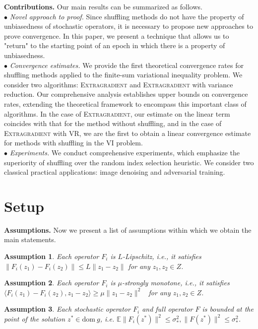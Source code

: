 \documentclass{article}
\newtheorem{assumption}{Assumption}
\begin{document}
\textbf{Contributions.}
Our main results can be summarized as follows.\\
$\bullet$ \textit{Novel approach to proof.} Since shuffling methods do not have the property of unbiasedness of stochastic operators, it is necessary to propose new approaches to prove convergence. In this paper, we present a technique that allows us to "return" to the starting point of an epoch in which there is a property of unbiasedness.\\
$\bullet$ \textit{Convergence estimates.} We provide the first theoretical convergence rates for shuffling methods applied to the finite-sum variational inequality problem. We consider two algorithms: \textsc{Extragradient} and \textsc{Extragradient} with variance reduction. Our comprehensive analysis establishes upper bounds on convergence rates, extending the theoretical framework to encompass this important class of algorithms. In the case of \textsc{Extragradient}, our estimate on the linear term coincides with that for the method without shuffling, and in the case of \textsc{Extragradient} with VR, we are the first to obtain a linear convergence estimate for methods with shuffling in the VI problem.\\
$\bullet$ \textit{Experiments.} We conduct comprehensive experiments, which emphasize the superiority of shuffling over the random index selection heuristic. We consider two classical practical applications: image denoising and adversarial training.

\vspace{-2mm}
\section{Setup}
\vspace{-2mm}

\textbf{Assumptions.} Now we present a list of assumptions within which we obtain the main statements.
\begin{assumption}\label{as:lipschitz}
    Each operator $F_i$ is $L$-Lipschitz, i.e., it satisfies $\|F_i(z_1) - F_i(z_2)\| \leq L\|z_1 - z_2\|$ for any $z_1, z_2 \in Z$.
\end{assumption}
\begin{assumption}\label{as:monotone}
    Each operator $F_i$ is $\mu$-strongly monotone, i.e., it satisfies $\langle F_i(z_1) - F_i(z_2), z_1 - z_2\rangle \geqslant \mu\|z_1 - z_2\|^2$ ~for any $z_1, z_2 \in Z$.  
\end{assumption}
\begin{assumption}\label{as:bound}
    Each stochastic operator $F_i$ and full operator $F$ is bounded at the point of the solution $z^*\in\text{dom}~ g$, i.e. $\mathbb E \|F_i(z^*)\|^2 \leqslant \sigma_*^2, \|F(z^*)\|^2 \leqslant \sigma_*^2$.  
\end{assumption}
\end{document}
